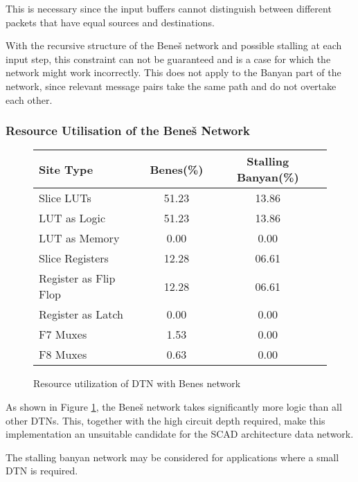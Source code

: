 	This is necessary since the input buffers cannot distinguish between different packets that have equal sources and destinations.
	
	With the recursive structure of the Beneš network and possible stalling at each input step, this constraint can not be guaranteed and is a case for which the network might work incorrectly.
	This does not apply to the Banyan part of the network, since relevant message pairs take the same path and do not overtake each other.
	
\subsubsection{Resource Utilisation of the Beneš Network}
	\label{sec:benes_resource_utilisation}
	\begin{figure}[!ht]
		\label{fig:benes_utilisation}
		\begin{center}
			\begin{tabular}{l | c | c }
				\textbf{Site Type}  & \textbf{Benes(\%)}&\textbf{Stalling Banyan(\%)} \\
				\hline \hline
				Slice LUTs          & 51.23             & 13.86 \\
				\quad LUT as Logic  & 51.23             & 13.86 \\
				\quad LUT as Memory & 0.00              & 0.00  \\
				Slice Registers     & 12.28             & 06.61 \\
				\quad Register as Flip Flop & 12.28     & 06.61 \\
				\quad Register as Latch     & 0.00      & 0.00  \\
				F7 Muxes                    & 1.53      & 0.00  \\
				F8 Muxes                    & 0.63      & 0.00 \\
			\end{tabular}
			\caption{Resource utilization of DTN with Benes network}
		\end{center}
	\end{figure}
	
	As shown in Figure \ref{fig:benes_utilisation}, the Beneš network takes significantly more logic than all other DTNs.
	This, together with the high circuit depth required, make this implementation an unsuitable candidate for the SCAD architecture data network.
	
	The stalling banyan network may be considered for applications where a small DTN is required.

